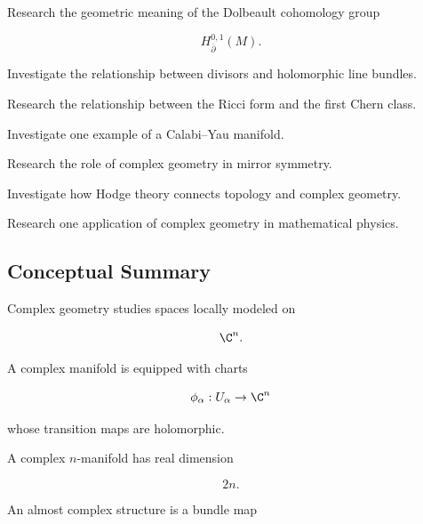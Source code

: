 \begin{exercise}[4]
Research the geometric meaning of the Dolbeault cohomology group

\[
H_{\bar{\partial}}^{0,1}(M).
\]
\end{exercise}

\begin{exercise}[4]
Investigate the relationship between divisors and holomorphic line bundles.
\end{exercise}

\begin{exercise}[4]
Research the relationship between the Ricci form and the first Chern class.
\end{exercise}

\begin{exercise}[4]
Investigate one example of a Calabi--Yau manifold.
\end{exercise}

\begin{exercise}[4]
Research the role of complex geometry in mirror symmetry.
\end{exercise}

\begin{exercise}[4]
Investigate how Hodge theory connects topology and complex geometry.
\end{exercise}

\begin{exercise}[4]
Research one application of complex geometry in mathematical physics.
\end{exercise}

\subsection{Conceptual Summary}
\label{subsec:complex-geometry-summary}

Complex geometry studies spaces locally modeled on

\[
\C^n.
\]

A complex manifold is equipped with charts

\[
\phi_\alpha:U_\alpha\to\C^n
\]

whose transition maps are holomorphic.

A complex \(n\)-manifold has real dimension

\[
\boxed{2n.}
\]

An almost complex structure is a bundle map

